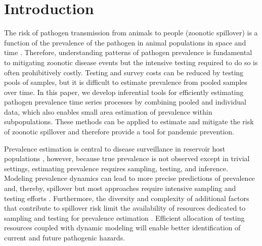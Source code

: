 \documentclass{article}
\begin{document}
%
\section{Introduction}

The risk of pathogen transmission from animals to people (zoonotic spillover) is a function of the prevalence of the pathogen in animal populations in space and time \cite{plowright2017pathways, becker2021ecological}. Therefore, understanding patterns of pathogen prevalence is fundamental to mitigating zoonotic disease events but the intensive testing required to do so is often prohibitively costly. Testing and survey costs can be reduced by testing pools of samples, but it is difficult to estimate prevalence from pooled samples over time. In this paper, we develop inferential tools for efficiently estimating pathogen prevalence time series processes by combining pooled and individual data, which also enables small area estimation of prevalence within subpopulations. These methods can be applied to estimate and mitigate the risk of zoonotic spillover and therefore provide a tool for pandemic prevention.

Prevalence estimation is central to disease surveillance in reservoir host populations \cite{kuiken2005pathogen}, however, because true prevalence is not observed except in trivial settings, estimating prevalence requires sampling, testing, and inference. Modeling prevalence dynamics can lead to more precise predictions of prevalence and, thereby, spillover but most approaches require intensive sampling and testing efforts \cite{plowright2019sampling}. Furthermore, the diversity and complexity of additional factors that contribute to spillover risk limit the availability of resources dedicated to sampling and testing for prevalence estimation \cite{plowright2017pathways}. Efficient allocation of testing resources coupled with dynamic modeling will enable better identification of current and future pathogenic hazards. 
\end{document}
